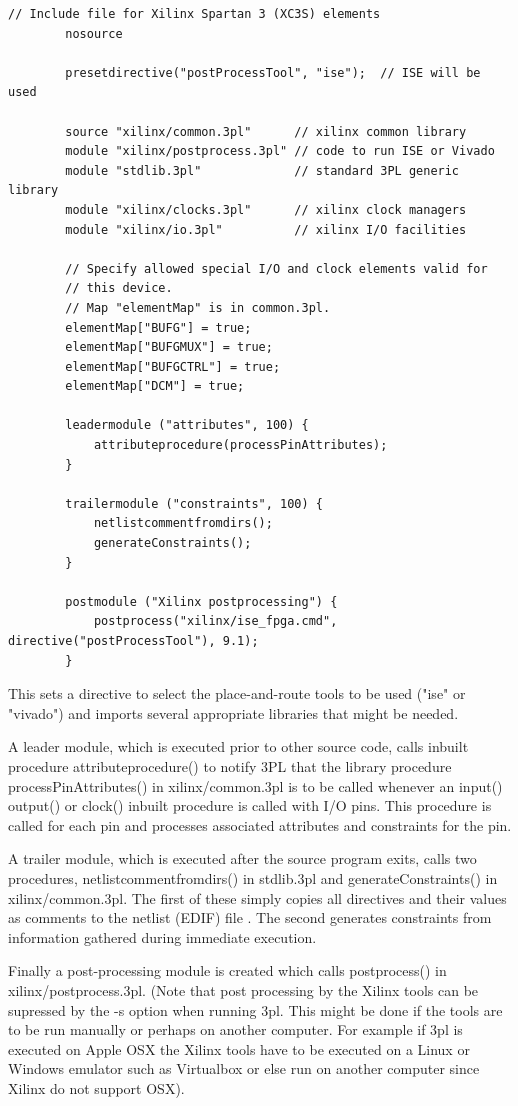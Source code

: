     \begin{lstlisting}[gobble=8, language=threepl]
        // Include file for Xilinx Spartan 3 (XC3S) elements
        nosource

        presetdirective("postProcessTool", "ise");  // ISE will be used

        source "xilinx/common.3pl"      // xilinx common library
        module "xilinx/postprocess.3pl" // code to run ISE or Vivado
        module "stdlib.3pl"             // standard 3PL generic library
        module "xilinx/clocks.3pl"      // xilinx clock managers
        module "xilinx/io.3pl"          // xilinx I/O facilities

        // Specify allowed special I/O and clock elements valid for
        // this device.
        // Map "elementMap" is in common.3pl.
        elementMap["BUFG"] = true;
        elementMap["BUFGMUX"] = true;
        elementMap["BUFGCTRL"] = true;
        elementMap["DCM"] = true;

        leadermodule ("attributes", 100) {
            attributeprocedure(processPinAttributes);
        }

        trailermodule ("constraints", 100) {
            netlistcommentfromdirs();
            generateConstraints();
        }

        postmodule ("Xilinx postprocessing") {
            postprocess("xilinx/ise_fpga.cmd", directive("postProcessTool"), 9.1);
        }
    \end{lstlisting}

    This sets a directive to select the place-and-route tools to be used ("ise"
    or "vivado") and imports several appropriate libraries that might be needed.
    
    A leader module, which is executed prior to other source code, calls
    inbuilt procedure attributeprocedure() to notify 3PL that the library
    procedure processPinAttributes() in xilinx/common.3pl is to be called
    whenever an input() output() or clock() inbuilt procedure is called
    with I/O pins. This procedure is called for each pin and processes associated
    attributes and constraints for the pin.
    
    A trailer module, which is executed after the source program exits, calls two
    procedures, netlistcommentfromdirs() in stdlib.3pl and generateConstraints()
    in xilinx/common.3pl. The first of these simply copies all directives and
    their values as comments to the netlist (EDIF) file . The second generates
    constraints from information gathered during immediate execution.

    Finally a post-processing module is created which calls postprocess() in
    xilinx/postprocess.3pl.  (Note that post processing by the Xilinx tools can
    be supressed by the -s option when running 3pl. This might be done if the
    tools are to be run manually or perhaps on another computer. For example if
    3pl is executed on Apple OSX the Xilinx tools have to be executed on a Linux
    or Windows emulator such as Virtualbox or else run on another computer since
    Xilinx do not support OSX).




